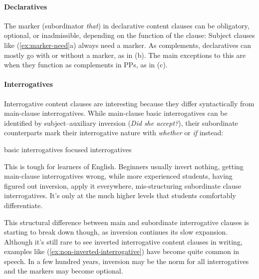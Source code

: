 \paragraph*{Declaratives} The marker (subordinator \textit{that}) in declarative content clauses can be obligatory, optional, or inadmissible, depending on the function of the clause:
\ea\label{ex:marker-need}
\z\z
Subject clauses like (\ref{ex:marker-need}a) always need a marker. As complements, declaratives can mostly go with or without a marker, as in (b). The main exceptions to this are when they function as complements in PPs, as in (c).


\paragraph*{Interrogatives}\label{sec:sub-interrog}

Interrogative content clauses are interesting because they differ syntactically from main-clause interrogatives. While main-clause basic interrogatives can be identified by subject--auxiliary inversion (\textit{Did she accept?}), their subordinate counterparts mark their interrogative nature with \textit{whether} or \textit{if} instead:

\ea basic interrogatives\label{ex:int-sub}
    \z
\z
\ea focused interrogatives
    \z
\z

This is tough for learners of English. Beginners usually invert nothing, getting main-clause interrogatives wrong, while more experienced students, having figured out inversion, apply it everywhere, mis-structuring subordinate clause interrogatives. It's only at the much higher levels that students comfortably differentiate.

This structural difference between main and subordinate interrogative clauses is starting to break down though, as inversion continues its slow expansion. Although it's still rare to see inverted interrogative content clauses in writing, examples like (\ref{ex:non-inverted-interrogative}) have become quite common in speech. In a few hundred years, inversion may be the norm for all interrogatives and the markers may become optional.

